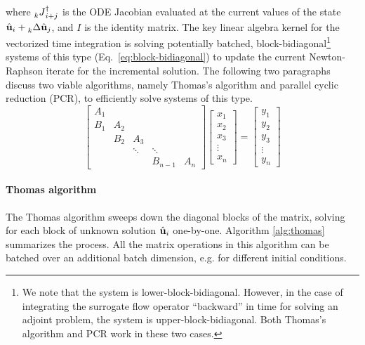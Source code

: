 where $\prescript{}{k}J_{i+j}^\dagger$ is the ODE Jacobian evaluated at the current values of the state $\hat{\textbf{u}}_i + \prescript{}{k}\Delta \hat{\textbf{u}}_{j}$, and $I$ is the identity matrix. The key linear algebra kernel for the vectorized time integration is solving potentially batched, block-bidiagonal\footnote{We note that the system is lower-block-bidiagonal. However, in the case of integrating the surrogate flow operator ``backward'' in time for solving an adjoint problem, the system is upper-block-bidiagonal. Both Thomas's algorithm and PCR work in these two cases.} systems of this type (Eq.~\ref{eq:block-bidiagonal}) to update the current Newton-Raphson iterate for the incremental solution.  The following two paragraphs discuss two viable algorithms, namely Thomas's algorithm and parallel cyclic reduction (PCR), to efficiently solve systems of this type.
\begin{equation}
\begin{bmatrix}
A_1 &  &  &  & \\ 
B_1 & A_2 &  &  & \\ 
 & B_2 & A_3 &  & \\ 
 &  & \ddots & \ddots & \\ 
 &  &  & B_{n-1} & A_n
\end{bmatrix} \begin{bmatrix}
x_1\\ 
x_2\\ 
x_3\\ 
\vdots\\ 
x_n
\end{bmatrix} = \begin{bmatrix}
y_1\\ 
y_2\\ 
y_3\\ 
\vdots\\ 
y_n
\end{bmatrix}
\label{eq:block-bidiagonal}
\end{equation}

\paragraph{Thomas algorithm}
The Thomas algorithm sweeps down the diagonal blocks of the matrix, solving for each block of unknown solution $\hat{\textbf{u}}_i$ one-by-one.  Algorithm \ref{alg:thomas} summarizes the process.  All the matrix operations in this algorithm can be batched over an additional batch dimension, e.g. for different initial conditions.

